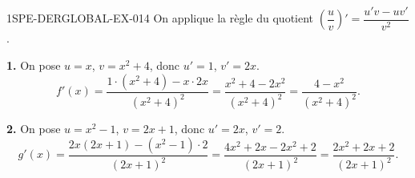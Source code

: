 \begin{corrige}{1SPE-DERGLOBAL-EX-014}
On applique la règle du quotient $\left(\dfrac{u}{v}\right)' = \dfrac{u'v - uv'}{v^2}$.

\textbf{1.} On pose $u = x$, $v = x^2+4$, donc $u' = 1$, $v' = 2x$.
\[
f'(x) = \frac{1 \cdot (x^2+4) - x \cdot 2x}{(x^2+4)^2} = \frac{x^2+4-2x^2}{(x^2+4)^2} = \boxed{\frac{4-x^2}{(x^2+4)^2}}.
\]

\textbf{2.} On pose $u = x^2-1$, $v = 2x+1$, donc $u' = 2x$, $v' = 2$.
\[
g'(x) = \frac{2x(2x+1) - (x^2-1) \cdot 2}{(2x+1)^2} = \frac{4x^2+2x - 2x^2+2}{(2x+1)^2} = \boxed{\frac{2x^2+2x+2}{(2x+1)^2}}.
\]
\end{corrige}
